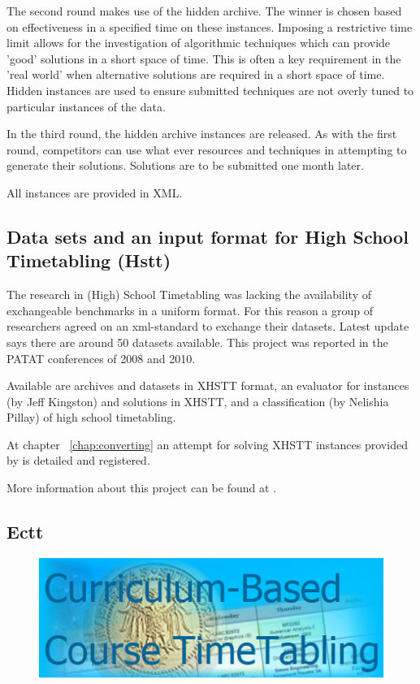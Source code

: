 The second round makes use of the hidden archive. The winner is chosen based on effectiveness in a specified time on these instances. Imposing a restrictive time limit allows for the investigation of algorithmic techniques which can provide 'good' solutions in a short space of time. This is often a key requirement in the 'real world' when alternative solutions are required in a short space of time. Hidden instances are used to ensure submitted techniques are not overly tuned to particular instances of the data.

In the third round, the hidden archive instances are released. As with the first round, competitors can use what ever resources and techniques in attempting to generate their solutions. Solutions are to be submitted one month later.

All instances are provided in XML.


\subsection{Data sets and an input format for High School Timetabling (Hstt)}
\label{hstt}

The research in (High) School Timetabling was lacking the availability of exchangeable benchmarks in a uniform format. For this reason a group of researchers agreed on an xml-standard to exchange their datasets. Latest update says there are around 50 datasets available. This project was reported in the PATAT conferences of 2008 and 2010.

Available are archives and datasets in XHSTT format, an evaluator for instances (by Jeff Kingston) and solutions in XHSTT, and a classification (by Nelishia Pillay) of high school timetabling.

At chapter ~\ref{chap:converting} an attempt for solving XHSTT instances provided by \cite{Hstt} is detailed and registered.

More information about this project can be found at \cite{Hstt}.


\subsection{Ectt}
\label{ectt}

\begin{figure}[ht]
\hfill\includegraphics[scale=0.4]{figures/ectt.png}
\end{figure}

